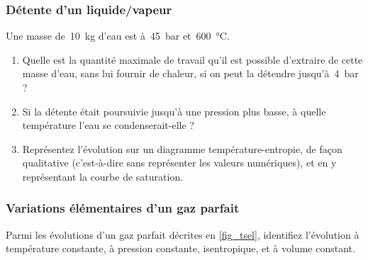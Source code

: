 \begin{boiboiboite}
	\propeau
	\propair
	\isentropiques
	\deltaentropie
\end{boiboiboite}


\subsubsection{Détente d’un liquide/vapeur}

	Une masse de~\SI{10}{\kilogram} d’eau est à~\SI{45}{\bar} et~\SI{600}{\degreeCelsius}.
	
	\begin{enumerate}
		\item Quelle est la quantité maximale de travail qu’il est possible d’extraire de cette masse d’eau, sans lui fournir de chaleur, si on peut la détendre jusqu’à~\SI{4}{\bar} ?
		\item Si la détente était poursuivie jusqu’à une pression plus basse, à quelle température l’eau se condenserait-elle ?
		\item Représentez l’évolution sur un diagramme température-entropie, de façon qualitative (c’est-à-dire sans représenter les valeurs numériques), et en y représentant la courbe de saturation.
	\end{enumerate}

\subsubsection{Variations élémentaires d’un gaz parfait}

	Parmi les évolutions d’un gaz parfait décrites en \cref{fig_tsel}, identifiez l’évolution à température constante, à pression constante, isentropique, et à volume constant.	
	
